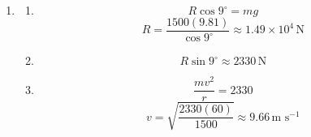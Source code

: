 \documentclass[12pt]{article}
\begin{document}
\begin{enumerate}[label=\textbf{\arabic*.}, itemsep=2em]
\begin{enumerate}[label=(\alph*)]
    \item
    \[
    \tan\theta=\frac{v^2}{rg}
    \]
    \[
    \theta=\tan^{-1}\left(\frac{16^2}{40(9.81)}\right)
    \approx 33.1^\circ
    \]

    \item The horizontal component of the normal reaction alone provides the required centripetal force.
\end{enumerate}

\item
\begin{enumerate}[label=(\alph*)]
    \item
    \[
    R\cos9^\circ = mg
    \]
    \[
    R=\frac{1500(9.81)}{\cos9^\circ}
    \approx 1.49\times10^4\,\text{N}
    \]

    \item
    \[
    R\sin9^\circ
    \approx 2330\,\text{N}
    \]

    \item
    \[
    \frac{mv^2}{r}=2330
    \]
    \[
    v=\sqrt{\frac{2330(60)}{1500}}
    \approx 9.66\,\text{m s}^{-1}
    \]
\end{enumerate}

\end{enumerate}
\end{document}
